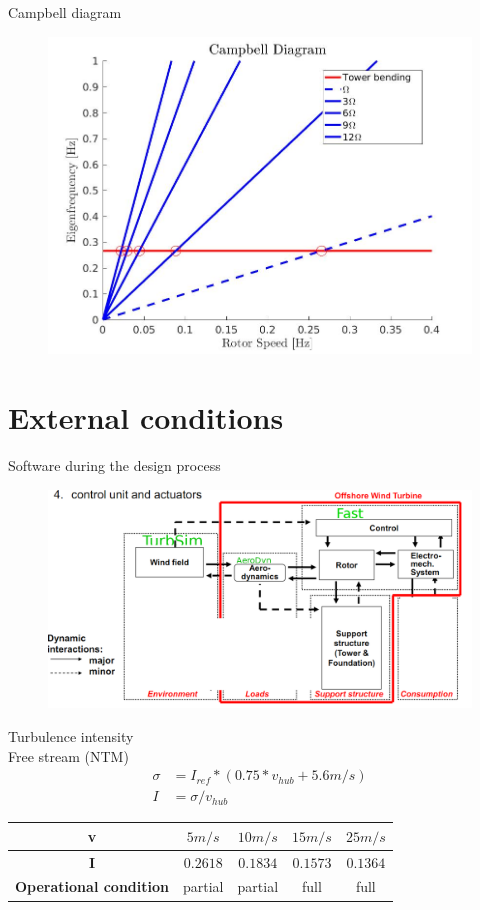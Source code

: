 \documentclass[12pt,t]{beamer}
\begin{document}
\begin{frame}
\huge 
Campbell diagram
\begin{figure}
\includegraphics[width=0.8\linewidth]{../CIP_4/figures/campbell.jpg}
\end{figure}
\end{frame}

\section{External conditions}
\begin{frame}
\huge 
Software during the design process
\begin{figure}
\includegraphics[width=0.8\linewidth]{figures/wind_turbine_overview.png}
\end{figure}
\end{frame}

\begin{frame}
\huge
Turbulence intensity \\[20pt]
\normalsize
Free stream (NTM)
\begin{align*}
 \sigma &= I_{ref}*(0.75*v_{hub}+5.6m/s) \\
     I &= \sigma/v_{hub}
\end{align*}
\begin{table}[H]
\centering
\begin{tabular}{| c | c | c | c | c |}
\hline
\textbf{v} & $5m/s$ & $10m/s$ & $15m/s$ & $25m/s$ \\
\hline
\textbf{I} & $0.2618$ & $0.1834$ & $0.1573$ & $0.1364$	\\
\hline
\textbf{Operational condition} & partial & partial & full & full	\\
\hline
\end{tabular}
\end{table}
\end{frame}
\end{document}

